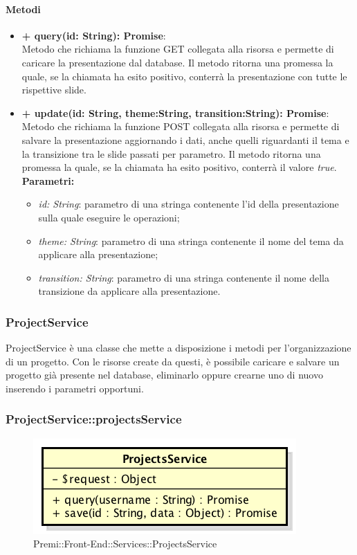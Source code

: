		\paragraph{Metodi}
		\begin{itemize}
			\item \textbf{+ query(id: String): Promise}:\\
			Metodo che richiama la funzione GET collegata alla risorsa e permette di caricare la presentazione dal \gls{database}. Il metodo ritorna una promessa la quale, se la chiamata ha esito positivo, conterrà la presentazione con tutte le rispettive \gls{slide}.\\
			\item \textbf{+ update(id: String, theme:String, transition:String): Promise}:\\
			Metodo che richiama la funzione POST collegata alla risorsa e permette di salvare la presentazione aggiornando i dati, anche quelli riguardanti il tema e la transizione tra le \gls{slide} passati per parametro. Il metodo ritorna una promessa la quale, se la chiamata ha esito positivo, conterrà il valore \textit{true}.\\
			\textbf{Parametri:}\\
			\begin{itemize}
				\item \textit{id: String}: parametro di una stringa contenente l'id della presentazione sulla quale eseguire le operazioni;
				\item \textit{theme: String}: parametro di una stringa contenente il nome del tema da applicare alla presentazione;
				\item \textit{transition: String}: parametro di una stringa contenente il nome della transizione da applicare alla presentazione.
			\end{itemize}
		\end{itemize}
\newpage


\subsubsection{ProjectService}
ProjectService è una classe che mette a disposizione i metodi per l'organizzazione di un progetto. Con le risorse create da questi, è possibile caricare e salvare un progetto già presente nel \gls{database}, eliminarlo oppure crearne uno di nuovo inserendo i parametri opportuni.

		\subsubsection{ProjectService::projectsService}
		\begin{figure}[h]
			\centering
				\includegraphics[width=0.4\linewidth]{img/premi_front_end_services_projectsservice}
			\caption[Premi::Front-End::Services::ProjectsService]{Premi::Front-End::Services::ProjectsService}
		\end{figure}
		
